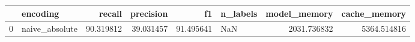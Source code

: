\begin{tabular}{llrrrlrr}
\toprule
{} &        encoding &     recall &  precision &         f1 & n\_labels &  model\_memory &  cache\_memory \\
\midrule
0 &  naive\_absolute &  90.319812 &  39.031457 &  91.495641 &      NaN &   2031.736832 &   5364.514816 \\
\bottomrule
\end{tabular}
